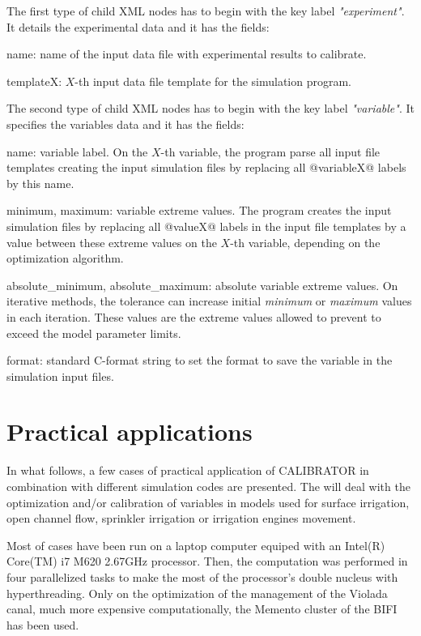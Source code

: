 \documentclass[review,authoryear]{elsarticle}
\begin{document}
The first type of child XML nodes has to begin with the key label
\emph{"experiment"}. It details the experimental data and it has the fields:
\begin{description}
\item{name}: name of the input data file with experimental results to calibrate.
\item{templateX}: $X$-th input data file template for the simulation program.
\end{description}

The second type of child XML nodes has to begin with the key label
\emph{"variable"}. It specifies the variables data and it has the fields:
\begin{description}
\item{name}: variable label. On the $X$-th variable, the program parse all input
file templates creating the input simulation files by replacing all
@variableX@ labels by this name.
\item{minimum, maximum}: variable extreme values. The program creates the input
simulation files by replacing all @valueX@ labels in the input file templates
by a value between these extreme values on the $X$-th variable, depending on the
optimization algorithm.
\item{absolute\_minimum, absolute\_maximum}: absolute variable extreme values.
On iterative methods, the tolerance can increase initial \emph{minimum} or
\emph{maximum} values in each iteration. These values are the extreme values
allowed to prevent to exceed the model parameter limits.
\item{format}: standard C-format string to set the format to save the variable
in the simulation input files.
\end{description}

\section{Practical applications}

In what follows, a few cases of practical application of CALIBRATOR in combination with
different simulation codes are presented. The will deal with the optimization
and/or calibration 
of variables in models used for surface irrigation, open channel flow, sprinkler irrigation or irrigation
engines movement.   

Most of cases have been run on a laptop computer equiped with an Intel(R) Core(TM) i7 M620 2.67GHz processor. 
Then, the computation was performed in four parallelized tasks to make the most of the processor's double nucleus with hyperthreading. Only on the optimization
of the management of the Violada canal, much more expensive computationally, the
Memento cluster of the BIFI has been used.
\end{document}
